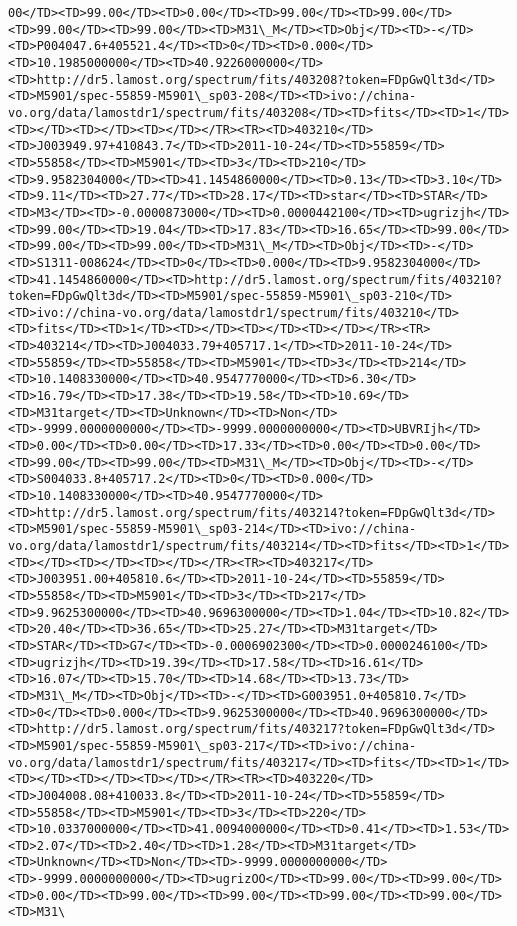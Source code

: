 \documentclass[11pt]{article}
\begin{document}
\begin{Verbatim}[commandchars=\\\{\}]
00</TD><TD>99.00</TD><TD>0.00</TD><TD>99.00</TD><TD>99.00</TD><TD>99.00</TD><TD>99.00</TD><TD>M31\_M</TD><TD>Obj</TD><TD>-</TD><TD>P004047.6+405521.4</TD><TD>0</TD><TD>0.000</TD><TD>10.1985000000</TD><TD>40.9226000000</TD><TD>http://dr5.lamost.org/spectrum/fits/403208?token=FDpGwQlt3d</TD><TD>M5901/spec-55859-M5901\_sp03-208</TD><TD>ivo://china-vo.org/data/lamostdr1/spectrum/fits/403208</TD><TD>fits</TD><TD>1</TD><TD></TD><TD></TD><TD></TD></TR><TR><TD>403210</TD><TD>J003949.97+410843.7</TD><TD>2011-10-24</TD><TD>55859</TD><TD>55858</TD><TD>M5901</TD><TD>3</TD><TD>210</TD><TD>9.9582304000</TD><TD>41.1454860000</TD><TD>0.13</TD><TD>3.10</TD><TD>9.11</TD><TD>27.77</TD><TD>28.17</TD><TD>star</TD><TD>STAR</TD><TD>M3</TD><TD>-0.0000873000</TD><TD>0.0000442100</TD><TD>ugrizjh</TD><TD>99.00</TD><TD>19.04</TD><TD>17.83</TD><TD>16.65</TD><TD>99.00</TD><TD>99.00</TD><TD>99.00</TD><TD>M31\_M</TD><TD>Obj</TD><TD>-</TD><TD>S1311-008624</TD><TD>0</TD><TD>0.000</TD><TD>9.9582304000</TD><TD>41.1454860000</TD><TD>http://dr5.lamost.org/spectrum/fits/403210?token=FDpGwQlt3d</TD><TD>M5901/spec-55859-M5901\_sp03-210</TD><TD>ivo://china-vo.org/data/lamostdr1/spectrum/fits/403210</TD><TD>fits</TD><TD>1</TD><TD></TD><TD></TD><TD></TD></TR><TR><TD>403214</TD><TD>J004033.79+405717.1</TD><TD>2011-10-24</TD><TD>55859</TD><TD>55858</TD><TD>M5901</TD><TD>3</TD><TD>214</TD><TD>10.1408330000</TD><TD>40.9547770000</TD><TD>6.30</TD><TD>16.79</TD><TD>17.38</TD><TD>19.58</TD><TD>10.69</TD><TD>M31target</TD><TD>Unknown</TD><TD>Non</TD><TD>-9999.0000000000</TD><TD>-9999.0000000000</TD><TD>UBVRIjh</TD><TD>0.00</TD><TD>0.00</TD><TD>17.33</TD><TD>0.00</TD><TD>0.00</TD><TD>99.00</TD><TD>99.00</TD><TD>M31\_M</TD><TD>Obj</TD><TD>-</TD><TD>S004033.8+405717.2</TD><TD>0</TD><TD>0.000</TD><TD>10.1408330000</TD><TD>40.9547770000</TD><TD>http://dr5.lamost.org/spectrum/fits/403214?token=FDpGwQlt3d</TD><TD>M5901/spec-55859-M5901\_sp03-214</TD><TD>ivo://china-vo.org/data/lamostdr1/spectrum/fits/403214</TD><TD>fits</TD><TD>1</TD><TD></TD><TD></TD><TD></TD></TR><TR><TD>403217</TD><TD>J003951.00+405810.6</TD><TD>2011-10-24</TD><TD>55859</TD><TD>55858</TD><TD>M5901</TD><TD>3</TD><TD>217</TD><TD>9.9625300000</TD><TD>40.9696300000</TD><TD>1.04</TD><TD>10.82</TD><TD>20.40</TD><TD>36.65</TD><TD>25.27</TD><TD>M31target</TD><TD>STAR</TD><TD>G7</TD><TD>-0.0006902300</TD><TD>0.0000246100</TD><TD>ugrizjh</TD><TD>19.39</TD><TD>17.58</TD><TD>16.61</TD><TD>16.07</TD><TD>15.70</TD><TD>14.68</TD><TD>13.73</TD><TD>M31\_M</TD><TD>Obj</TD><TD>-</TD><TD>G003951.0+405810.7</TD><TD>0</TD><TD>0.000</TD><TD>9.9625300000</TD><TD>40.9696300000</TD><TD>http://dr5.lamost.org/spectrum/fits/403217?token=FDpGwQlt3d</TD><TD>M5901/spec-55859-M5901\_sp03-217</TD><TD>ivo://china-vo.org/data/lamostdr1/spectrum/fits/403217</TD><TD>fits</TD><TD>1</TD><TD></TD><TD></TD><TD></TD></TR><TR><TD>403220</TD><TD>J004008.08+410033.8</TD><TD>2011-10-24</TD><TD>55859</TD><TD>55858</TD><TD>M5901</TD><TD>3</TD><TD>220</TD><TD>10.0337000000</TD><TD>41.0094000000</TD><TD>0.41</TD><TD>1.53</TD><TD>2.07</TD><TD>2.40</TD><TD>1.28</TD><TD>M31target</TD><TD>Unknown</TD><TD>Non</TD><TD>-9999.0000000000</TD><TD>-9999.0000000000</TD><TD>ugrizOO</TD><TD>99.00</TD><TD>99.00</TD><TD>0.00</TD><TD>99.00</TD><TD>99.00</TD><TD>99.00</TD><TD>99.00</TD><TD>M31\
\end{Verbatim}
\end{document}
